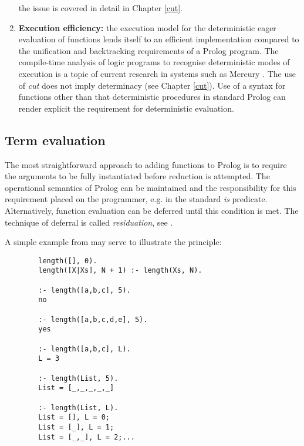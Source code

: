 \begin{enumerate}
{  the issue is covered in detail in Chapter \ref{cut}.}
\item{\textbf{Execution efficiency:} the execution model for
  the deterministic eager evaluation of functions lends itself to an 
  efficient implementation
  compared to the unification and backtracking requirements of a Prolog program.  The
  compile-time analysis of logic programs to recognise deterministic modes of execution
  is a topic of current research in systems such as Mercury \cite{HCSR95}.  The use of
  \textit{cut} does not imply determinacy (see Chapter \ref{cut}).  Use of a syntax 
  for functions other than that deterministic procedures in
  standard Prolog can render explicit the requirement for
  deterministic evaluation.}
\end{enumerate}

\subsection{Term evaluation}

The most straightforward approach to adding functions to Prolog is to require the arguments
to be fully instantiated before reduction is attempted.  The operational semantics of Prolog
can be maintained and the responsibility for this requirement placed on the programmer, e.g. in
the standard \textit{is} predicate.  Alternatively,
function evaluation can be deferred until this condition is met.
The technique of deferral is called \textit{residuation}, see \cite{AKLN87}.

A simple example from \cite{MBB+93} may serve to illustrate the principle:

\noindent
\begin{verbatim}
		length([], 0).
		length([X|Xs], N + 1) :- length(Xs, N).

		:- length([a,b,c], 5).
		no

		:- length([a,b,c,d,e], 5).
		yes

		:- length([a,b,c], L).
		L = 3

		:- length(List, 5).
		List = [_,_,_,_,_]

		:- length(List, L).
		List = [], L = 0;
		List = [_], L = 1;
		List = [_,_], L = 2;...
\end{verbatim}

